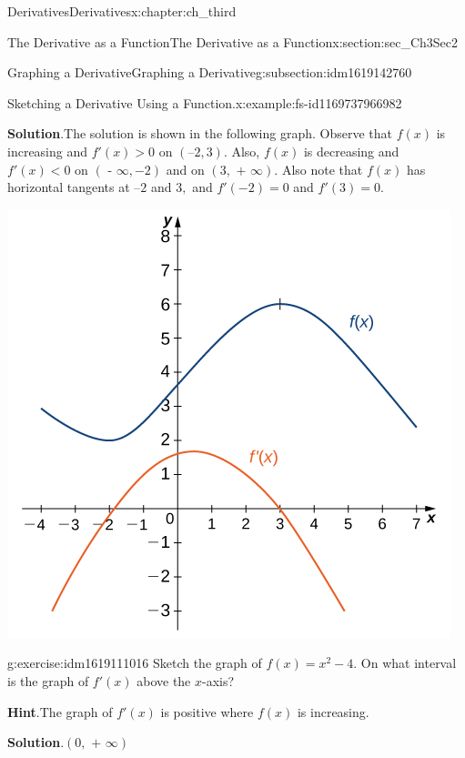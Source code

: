 \documentclass[oneside,10pt,]{book}
\newcommand{\blocktitlefont}{\relax}
\numberwithin{equation}{section}
\newcommand{\lt}{<}
\newcommand{\gt}{>}
\begin{document}
\begin{chapterptx}{Derivatives}{}{Derivatives}{}{}{x:chapter:ch_third}
\begin{sectionptx}{The Derivative as a Function}{}{The Derivative as a Function}{}{}{x:section:sec_Ch3Sec2}
\begin{subsectionptx}{Graphing a Derivative}{}{Graphing a Derivative}{}{}{g:subsection:idm1619142760}
\begin{example}{Sketching a Derivative Using a Function.}{x:example:fs-id1169737966982}
\begin{image}{0.25}{0.5}{0.25}
\end{image}%
\par\smallskip%
\noindent\textbf{\blocktitlefont Solution}.\hypertarget{g:solution:idm1619121128}{}\quad{}The solution is shown in the following graph. Observe that \(f(x)\) is increasing and \(f'(x)\gt 0\) on \((–2,3).\) Also, \(f(x)\) is decreasing and \(f'(x)\lt 0\) on \((\text{ - }\infty ,-2)\) and on \((3,\text{ + }\infty ).\) Also note that \(f(x)\) has horizontal tangents at \(–2\) and \(3,\) and \(f'(-2)=0\) and \(f'(3)=0.\)%
\begin{image}{0.25}{0.5}{0.25}%
\includegraphics[width=\linewidth]{external/CNX_Calc_Figure_03_02_005.jpg}
\end{image}%
\end{example}
\begin{inlineexercise}{}{g:exercise:idm1619111016}%
Sketch the graph of \(f(x)=x^2-4.\) On what interval is the graph of \(f'(x)\) above the \(x\)-axis?%
\par\smallskip%
\noindent\textbf{\blocktitlefont Hint}.\hypertarget{g:hint:idm1619111528}{}\quad{}The graph of \(f'(x)\) is positive where \(f(x)\) is increasing.%
\par\smallskip%
\noindent\textbf{\blocktitlefont Solution}.\hypertarget{g:solution:idm1619110504}{}\quad{}\((0,\text{ + }\infty )\)%
\end{inlineexercise}%
\end{subsectionptx}

\end{sectionptx}
\end{chapterptx}
\end{document}
